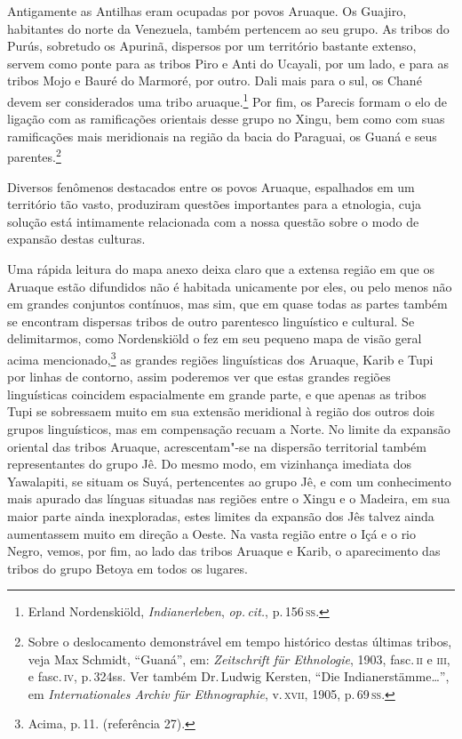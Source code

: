 Antigamente as Antilhas eram ocupadas
por povos Aruaque. Os Guajiro, habitantes do norte da Venezuela, também
pertencem ao seu grupo. As tribos do Purús, sobretudo os Apurinã,
dispersos por um território bastante extenso, servem como ponte para as
tribos Piro e Anti do Ucayali, por um lado, e para as tribos Mojo e
Bauré do Marmoré, por outro. Dali mais para o sul, os Chané devem ser
considerados uma tribo aruaque.\footnote{Erland Nordenskiöld,
  \textit{Indianerleben}, \textit{op.\,cit.}, p.\,156\,\textsc{ss}.} Por fim, os Parecis formam o elo de ligação com as
ramificações orientais desse grupo no Xingu, bem como com suas
ramificações mais meridionais na região da bacia do Paraguai, os Guaná e
seus parentes.\footnote{Sobre o deslocamento demonstrável em tempo
  histórico destas últimas tribos, veja Max Schmidt, ``Guaná'', em:
  \textit{Zeitschrift für Ethnologie}, 1903, fasc.\,\textsc{ii} e \textsc{iii}, e fasc.\,\textsc{iv}, p.\,324ss. Ver também Dr.\,Ludwig Kersten, ``Die Indianerstämme\ldots'', em
  \textit{Internationales Archiv für Ethnographie}, v.\,\textsc{xvii}, 1905, p.\,69\,\textsc{ss}.}

Diversos fenômenos destacados entre os povos Aruaque, espalhados em um
território tão vasto, produziram questões importantes para a etnologia,
cuja solução está intimamente relacionada com a nossa questão sobre o
modo de expansão destas culturas.

Uma rápida leitura do mapa anexo deixa claro que a extensa região em
que os Aruaque estão difundidos não é habitada unicamente por eles, ou
pelo menos não em grandes conjuntos contínuos, mas sim, que em quase
todas as partes também se encontram dispersas tribos de outro
parentesco linguístico e cultural. Se delimitarmos, como Nordenskiöld o
fez em seu pequeno mapa de visão geral acima mencionado,\footnote{Acima,
  p.\,11. (referência 27).} as grandes regiões linguísticas dos Aruaque,
Karib e Tupi por linhas de contorno, assim poderemos ver que estas
grandes regiões linguísticas coincidem espacialmente em grande parte, e
que apenas as tribos Tupi se sobressaem muito em sua extensão meridional
à região dos outros dois grupos linguísticos, mas em compensação recuam
a Norte. No limite da expansão oriental das tribos Aruaque,
acrescentam"-se na dispersão territorial também representantes do grupo
Jê. Do mesmo modo, em vizinhança imediata dos Yawalapiti, se situam os Suyá,
pertencentes ao grupo Jê, e com um conhecimento mais apurado das línguas
situadas nas regiões entre o Xingu e o Madeira, em sua maior parte ainda
inexploradas, estes limites da expansão dos Jês talvez ainda aumentassem
muito em direção a Oeste. Na vasta região entre o Içá e o rio Negro,
vemos, por fim, ao lado das tribos Aruaque e Karib, o aparecimento das
tribos do grupo Betoya em todos os lugares.

